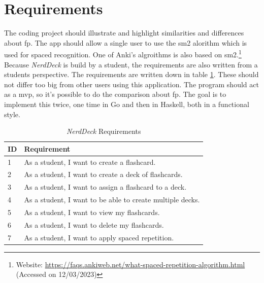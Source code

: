     \section{Requirements}
    The coding project should illustrate and highlight similarities and differences about \ac{fp}. The \ac{app} should allow a single user to use the \ac{sm2} alorithm which is used for spaced recognition.\cite{sm2} One of Anki's algroithms is also based on \ac{sm2}.\footnote{Website: \url{https://faqs.ankiweb.net/what-spaced-repetition-algorithm.html} (Accessed on 12/03/2023)} Because \textit{NerdDeck} is build by a student, the requirements are also written from a students perspective. The requirements are written down in table \ref{tab:requirements}. These should not differ too big from other users using this application. The program should act as a \ac{mvp}, so it's possible to do the comparison about \ac{fp}. The goal is to implement this twice, one time in Go and then in Haskell, both in a functional style.
    \begin{table}[h]
        \centering
        \begin{tabular}{|m{0.5in}|m{4in}|}
            \hline
            \textbf{ID} & \textbf{Requirement} \\
            \hline
            1 & As a student, I want to create a flashcard. \\
            \hline
            2 & As a student, I want to create a deck of flashcards. \\
            \hline
            3 & As a student, I want to assign a flashcard to a deck. \\
            \hline
            4 & As a student, I want to be able to create multiple decks. \\
            \hline
            5 & As a student, I want to view my flashcards. \\
            \hline
            6 & As a student, I want to delete my flashcards. \\
            \hline
            7 & As a student, I want to apply spaced repetition. \\
            \hline
        \end{tabular}
        \caption{\textit{NerdDeck} Requirements}
        \label{tab:requirements}
    \end{table}

